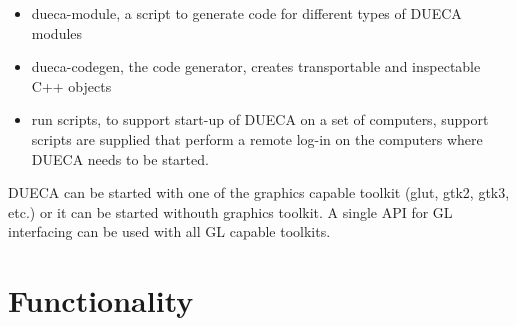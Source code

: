 \documentclass[11pt,a4paper,twoside]{scrartcl}
\begin{document}
\begin{itemize}
\item dueca-module, a script to generate code for different types of DUECA modules
\item dueca-codegen, the code generator, creates transportable and inspectable C++ objects
\item run scripts, to support start-up of DUECA on a set of computers, support scripts are supplied that perform a remote log-in on the computers where DUECA needs to be started.
\end{itemize}

DUECA can be started with one of the graphics capable toolkit (glut, gtk2, gtk3, etc.) or it can be started withouth graphics toolkit. A single API for GL interfacing can be used with all GL capable toolkits.

\section{Functionality}
\end{document}
